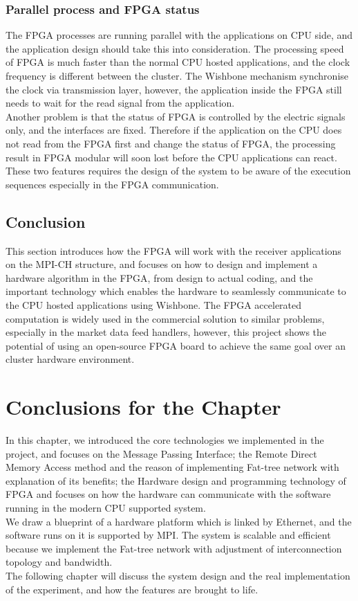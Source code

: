 \documentclass[11pt,openright,a4paper]{report}
\begin{document}
\subsubsection{Parallel process and FPGA status}
The FPGA processes are running parallel with the applications on CPU side, and the application design should take this into consideration. The processing speed of FPGA is much faster than the normal CPU hosted applications, and the clock frequency is different between the cluster. The Wishbone mechanism synchronise the clock via transmission layer, however, the application inside the FPGA still needs to wait for the read signal from the application.\\
Another problem is that the status of FPGA is controlled by the electric signals only, and the interfaces are fixed. Therefore if the application on the CPU does not read from the FPGA first and change the status of FPGA, the processing result in FPGA modular will soon lost before the CPU applications can react.\\
These two features requires the design of the system to be aware of the execution sequences especially in the FPGA communication.\\
\subsection{Conclusion}
This section introduces how the FPGA will work with the receiver applications on the MPI-CH structure, and focuses on how to design and implement a hardware algorithm in the FPGA, from design to actual coding, and the important technology which enables the hardware to seamlessly communicate to the CPU hosted applications using Wishbone. The FPGA accelerated computation is widely used in the commercial solution to similar problems, especially in the market data feed handlers, however, this project shows the potential of using an open-source FPGA board to achieve the same goal over an cluster hardware environment.\\ 
\section{Conclusions for the Chapter}
In this chapter, we introduced the core technologies we implemented in the project, and focuses on the Message Passing Interface; the Remote Direct Memory Access method and the reason of implementing Fat-tree network with explanation of its benefits; the Hardware design and programming technology of FPGA and focuses on how the hardware can communicate with the software running in the modern CPU supported system.\\
We draw a blueprint of a hardware platform which is linked by Ethernet, and the software runs on it is supported by MPI. The system is scalable and efficient because we implement the Fat-tree network with adjustment of interconnection topology and bandwidth.\\
The following chapter will discuss the system design and the real implementation of the experiment, and how the features are brought to life.
\end{document}
